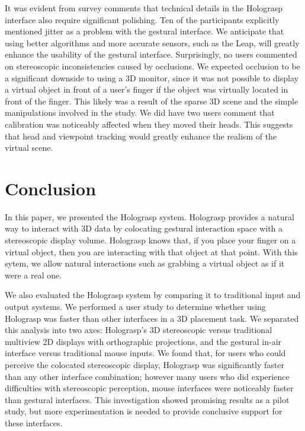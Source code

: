 \documentclass[pageno]{jpaper}
\begin{document}
It was evident from survey comments that technical details in the Holograsp interface also require significant
polishing. Ten of the participants explicitly mentioned jitter as a problem with the gestural interface. We anticipate
that using better algorithms and more accurate sensors, such as the Leap, will greatly enhance the usability of the
gestural interface. Surprisingly, no users commented on stereoscopic inconsistencies caused by occlusions. We expected
occlusion to be a significant downside to using a 3D monitor, since it was not possible to display a virtual object in front
of a user's finger if the object was virtually located in front of the finger. This likely was a result of the sparse 3D
scene and the simple manipulations involved in the study. We did have two users comment that calibration
was noticeably affected when they moved their heads. This suggests that head and viewpoint tracking would greatly enhance the 
realism of the virtual scene.

\section{Conclusion}
In this paper, we presented the Holograsp system. Holograsp provides a natural way to interact with 3D data by colocating gestural interaction
space with a stereoscopic display volume. Holograsp knows that, if you place your finger on a virtual object, then you are interacting with that object at
that point. With this sytem, we allow natural interactions such as grabbing a virtual object as if it were a real one.

We also evaluated the Holograsp system by comparing it to traditional input and output systems. We performed a user study to determine whether
using Holograsp was faster than other interfaces in a 3D placement task. We separated this analysis into two axes: Holograsp's 3D stereoscopic
versus traditional multiview 2D displays with orthographic projections, and the gestural in-air interface versus traditional mouse inputs. We
found that, for users who could perceive the colocated stereoscopic display, Holograsp was significantly faster than any other interface combination;
however many users who did experience difficulties with stereoscopic perception, mouse interfaces were noticeably faster than gestural interfaces.
This investigation showed promising results as a pilot study, but more experimentation is needed to provide conclusive support for these interfaces.
\end{document}
